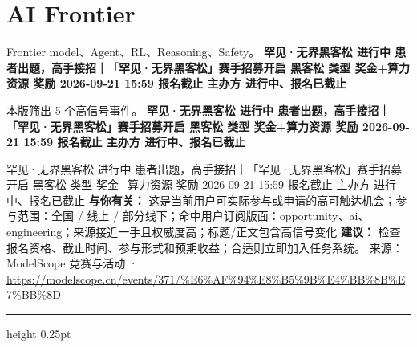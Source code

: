 \documentclass[10.5pt]{ctexart}
\begin{document}
\section*{AI Frontier}
{\color{ormuted} Frontier model、Agent、RL、Reasoning、Safety。}
\vspace{2mm}
{\LARGE\bfseries 罕见·无界黑客松 进行中 患者出题，高手接招｜「罕见·无界黑客松」赛手招募开启 黑客松 类型 奖金+算力资源 奖励 2026-09-21 15:59 报名截止 主办方 进行中、报名已截止}\par
\vspace{1mm}
{\color{ormuted} 本版筛出 5 个高信号事件。}
\vspace{3mm}
{\Large\bfseries 罕见·无界黑客松 进行中 患者出题，高手接招｜「罕见·无界黑客松」赛手招募开启 黑客松 类型 奖金+算力资源 奖励 2026-09-21 15:59 报名截止 主办方 进行中、报名已截止}\par
罕见·无界黑客松 进行中 患者出题，高手接招｜「罕见·无界黑客松」赛手招募开启 黑客松 类型 奖金+算力资源 奖励 2026-09-21 15:59 报名截止 主办方 进行中、报名已截止
\textbf{与你有关：} 这是当前用户可实际参与或申请的高可触达机会；参与范围：全国 / 线上 / 部分线下；命中用户订阅版面：opportunity、ai、engineering；来源接近一手且权威度高；标题/正文包含高信号变化
\textbf{建议：} 检查报名资格、截止时间、参与形式和预期收益；合适则立即加入任务系统。
{\footnotesize\color{ormuted} 来源：ModelScope 竞赛与活动 · \url{https://modelscope.cn/events/371/%E6%AF%94%E8%B5%9B%E4%BB%8B%E7%BB%8D}}
\vspace{4mm}
\hrule height 0.25pt
\vspace{3mm}
\end{document}
